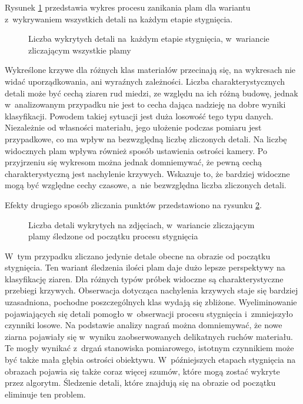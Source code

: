 Rysunek \ref{fig:blob_chart_all} przedstawia wykres procesu zanikania plam dla
wariantu z~wykrywaniem wszystkich detali na każdym etapie stygnięcia.
\begin{figure}[htb]
	\centering
	
	\caption{Liczba wykrytych detali na~każdym etapie stygnięcia, w~wariancie
		zliczającym wszystkie plamy}
	\label{fig:blob_chart_all}
\end{figure}
Wykreślone krzywe dla różnych klas materiałów przecinają się, na wykresach
nie widać uporządkowania, ani wyraźnych zależności.
Liczba charakterystycznych detali może być cechą ziaren rud miedzi, ze
względu na ich różną budowę, jednak w~analizowanym przypadku nie jest to
cecha dająca nadzieję na dobre wyniki klasyfikacji.
Powodem takiej sytuacji jest duża losowość tego typu danych.
Niezależnie od własności materiału, jego ułożenie podczas pomiaru jest
przypadkowe, co ma wpływ na bezwzględną liczbę zliczonych detali.
Na liczbę widocznych plam wpływa również sposób ustawienia ostrości kamery.
Po przyjrzeniu się wykresom można jednak domniemywać, że pewną cechą
charakterystyczną jest nachylenie krzywych.
Wskazuje to, że bardziej widoczne mogą być względne cechy czasowe, a~nie
bezwzględna liczba zliczonych detali.

Efekty drugiego sposób zliczania punktów przedstawiono na rysunku
\ref{fig:blob_chart_rem}.
\begin{figure}[htb]
	\centering
	
	\caption{Liczba detali wykrytych na zdjęciach, w~wariancie zliczającym
		plamy śledzone od początku procesu stygnięcia}
	\label{fig:blob_chart_rem}
\end{figure}
W~tym przypadku zliczano jedynie detale obecne na obrazie od początku
stygnięcia.
Ten wariant śledzenia ilości plam daje dużo lepsze perspektywy na klasyfikację
ziaren.
Dla różnych typów próbek widoczne są charakterystyczne przebiegi krzywych.
Obserwacja dotycząca nachylenia krzywych staje się bardziej uzasadniona,
pochodne poszczególnych klas wydają się zbliżone.
Wyeliminowanie pojawiających się detali pomogło w~obserwacji procesu
stygnięcia i~zmniejszyło czynniki losowe.
Na podstawie analizy nagrań można domniemywać, że nowe ziarna pojawiały
się w~wyniku zaobserwowanych delikatnych ruchów materiału.
Te mogły wynikać z~drgań stanowiska pomiarowego, istotnym czynnikiem może
być także mała głębia ostrości obiektywu.
W~późniejszych etapach stygnięcia na obrazach pojawia się także coraz więcej
szumów, które mogą zostać wykryte przez algorytm.
Śledzenie detali, które znajdują się na obrazie od początku eliminuje ten
problem.

